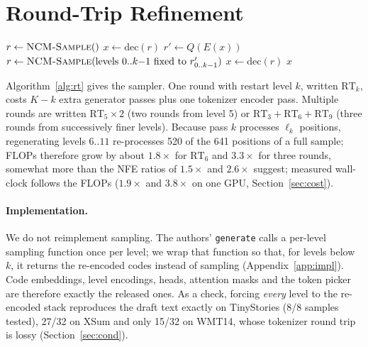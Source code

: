 \documentclass[10pt]{article}
\newcommand{\RT}[1]{\mathrm{RT}_{#1}}
\begin{document}
\section{Round-Trip Refinement}
\label{sec:method}

\begin{algorithm}[t]
\caption{Round-trip refinement with restart levels $k_1, \dots, k_m$}
\label{alg:rt}
\begin{algorithmic}[1]
\State $r \gets \textsc{NCM-Sample}()$ 
\State $x \gets \mathrm{dec}(r)$
  \State $r' \gets Q(E(x))$ 
  \State $r \gets \textsc{NCM-Sample}(\text{levels } 0..k{-}1 \text{ fixed to } r'_{0..k-1})$ 
  \State $x \gets \mathrm{dec}(r)$
\EndFor
\State \Return $x$
\end{algorithmic}
\end{algorithm}

Algorithm~\ref{alg:rt} gives the sampler. One round with restart level $k$, written $\RT{k}$, costs $K{-}k$ extra generator passes plus one tokenizer encoder pass. Multiple rounds are written $\RT{5}{\times}2$ (two rounds from level 5) or $\RT{3}{+}\RT{6}{+}\RT{9}$ (three rounds from successively finer levels). Because pass $k$ processes $\ell_k$ positions, regenerating levels $6..11$ re-processes 520 of the 641 positions of a full sample; FLOPs therefore grow by about $1.8\times$ for $\RT{6}$ and $3.3\times$ for three rounds, somewhat more than the NFE ratios of $1.5\times$ and $2.6\times$ suggest; measured wall-clock follows the FLOPs ($1.9\times$ and $3.8\times$ on one GPU, Section~\ref{sec:cost}).

\paragraph{Implementation.} We do not reimplement sampling. The authors' \texttt{generate} calls a per-level sampling function once per level; we wrap that function so that, for levels below $k$, it returns the re-encoded codes instead of sampling (Appendix~\ref{app:impl}). Code embeddings, level encodings, heads, attention masks and the token picker are therefore exactly the released ones. As a check, forcing \emph{every} level to the re-encoded stack reproduces the draft text exactly on TinyStories (8/8 samples tested), 27/32 on XSum and only 15/32 on WMT14, whose tokenizer round trip is lossy (Section~\ref{sec:cond}).
\end{document}
